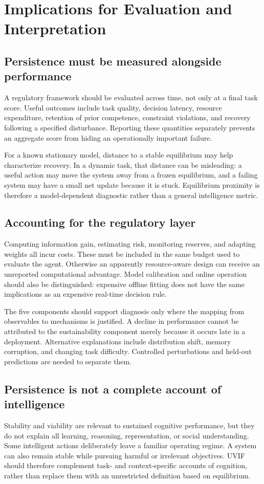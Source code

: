 \section{Implications for Evaluation and Interpretation}
\label{sec:implications}

\subsection{Persistence must be measured alongside performance}
A regulatory framework should be evaluated across time, not only at a final task score. Useful outcomes include task quality, decision latency, resource expenditure, retention of prior competence, constraint violations, and recovery following a specified disturbance. Reporting these quantities separately prevents an aggregate score from hiding an operationally important failure.

For a known stationary model, distance to a stable equilibrium may help characterize recovery. In a dynamic task, that distance can be misleading: a useful action may move the system away from a frozen equilibrium, and a failing system may have a small net update because it is stuck. Equilibrium proximity is therefore a model-dependent diagnostic rather than a general intelligence metric.

\subsection{Accounting for the regulatory layer}
Computing information gain, estimating risk, monitoring reserves, and adapting weights all incur costs. These must be included in the same budget used to evaluate the agent. Otherwise an apparently resource-aware design can receive an unreported computational advantage. Model calibration and online operation should also be distinguished: expensive offline fitting does not have the same implications as an expensive real-time decision rule.

The five components should support diagnosis only where the mapping from observables to mechanisms is justified. A decline in performance cannot be attributed to the sustainability component merely because it occurs late in a deployment. Alternative explanations include distribution shift, memory corruption, and changing task difficulty. Controlled perturbations and held-out predictions are needed to separate them.

\subsection{Persistence is not a complete account of intelligence}
Stability and viability are relevant to sustained cognitive performance, but they do not explain all learning, reasoning, representation, or social understanding. Some intelligent actions deliberately leave a familiar operating regime. A system can also remain stable while pursuing harmful or irrelevant objectives. UVIF should therefore complement task- and context-specific accounts of cognition, rather than replace them with an unrestricted definition based on equilibrium.
